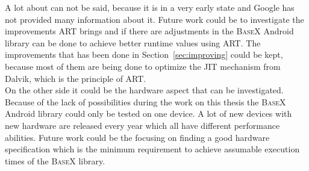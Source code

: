A lot about can not be said, because it is in a very early state and Google has not provided many information about it.
Future work could be to investigate the improvements ART brings and if there are adjustments in the \textsc{BaseX} Android library can be done to achieve better runtime values using ART.
The improvements that has been done in Section~\ref{sec:improving} could be kept, because most of them are being done to optimize the JIT mechanism from Dalvik, which is the principle of ART.\\
On the other side it could be the hardware aspect that can be investigated.
Because of the lack of possibilities during the work on this thesis the \textsc{BaseX} Android library could only be tested on one device.
A lot of new devices with new hardware are released every year which all have different performance abilities.
Future work could be the focusing on finding a good hardware specification which is the minimum requirement to achieve assumable execution times of the \textsc{BaseX} library.
